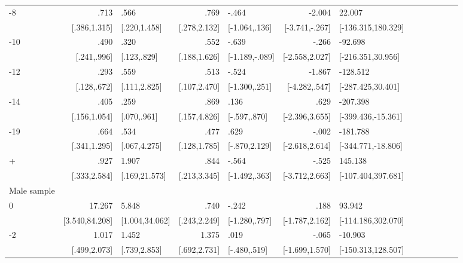 \begin{table}[h]
\begin{adjustbox}{max width=\linewidth}
\begin{threeparttable}
{\begin{tabular}{l*{6}{D{.}{.}{-1}l}}
-8             &            .713&            .566&            .769&           -.464&          -2.004&          22.007\\
                &    [.386,1.315]&    [.220,1.458]&    [.278,2.132]&   [-1.064,.136]&  [-3.741,-.267]&[-136.315,180.329]\\
-10            &            .490&            .320&            .552&           -.639&           -.266&         -92.698\\
                &     [.241,.996]&     [.123,.829]&    [.188,1.626]&  [-1.189,-.089]&  [-2.558,2.027]&[-216.351,30.956]\\
-12           &            .293&            .559&            .513&           -.524&          -1.867&        -128.512\\
                &     [.128,.672]&    [.111,2.825]&    [.107,2.470]&   [-1.300,.251]&   [-4.282,.547]&[-287.425,30.401]\\
-14           &            .405&            .259&            .869&            .136&            .629&        -207.398\\
                &    [.156,1.054]&     [.070,.961]&    [.157,4.826]&    [-.597,.870]&  [-2.396,3.655]&[-399.436,-15.361]\\
-19           &            .664&            .534&            .477&            .629&           -.002&        -181.788\\
                &    [.341,1.295]&    [.067,4.275]&    [.128,1.785]&   [-.870,2.129]&  [-2.618,2.614]&[-344.771,-18.806]\\
+             &            .927&           1.907&            .844&           -.564&           -.525&         145.138\\
                &    [.333,2.584]&   [.169,21.573]&    [.213,3.345]&   [-1.492,.363]&  [-3.712,2.663]&[-107.404,397.681]\\
\midrule
Male sample &&&&&&\\
0               &          17.267&           5.848&            .740&           -.242&            .188&          93.942\\
                &  [3.540,84.208]&  [1.004,34.062]&    [.243,2.249]&   [-1.280,.797]&  [-1.787,2.162]&[-114.186,302.070]\\
-2             &           1.017&           1.452&           1.375&            .019&           -.065&         -10.903\\
                &    [.499,2.073]&    [.739,2.853]&    [.692,2.731]&    [-.480,.519]&  [-1.699,1.570]&[-150.313,128.507]\\

\end{tabular}}
\end{threeparttable}
\end{adjustbox}
\end{table}
